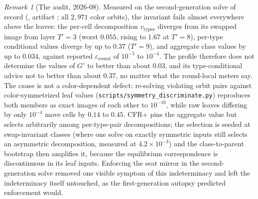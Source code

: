 \documentclass[11pt]{article}
\theoremstyle{plain}
\theoremstyle{definition}
\theoremstyle{remark}
\newtheorem{remark}[theorem]{Remark}
\newcommand{\gp}{\ensuremath{G'}}
\begin{document}
\begin{remark}[The audit, 2026-08]
Measured on the second-generation solve of record
(, artifact
; all $2{,}971$ color orbits), the
invariant fails almost everywhere above the leaves: the per-cell
decomposition $v_{\text{types}}$ diverges from its swapped image from
layer $T'{=}3$ (worst $0.055$, rising to $1.67$ at $T'{=}8$), per-type
conditional values diverge by up to $0.37$ ($T'{=}9$), and aggregate
class values by up to $0.034$, against reported
$\varepsilon_{\text{round}}$ of $10^{-5}$ to $10^{-4}$. The profile
therefore does not determine the values of $\gp$ to better than about
$0.03$, and its type-conditional advice not to better than about
$0.37$, no matter what the round-local meters say. The cause is not a
color-dependent defect: re-solving violating orbit pairs against
color-symmetrized leaf values
(\texttt{scripts/symmetry\_discriminate.py}) reproduces both members
as exact images of each other to $10^{-16}$, while raw leaves
differing by only $10^{-4}$ move cells by $0.14$ to $0.45$. CFR+ pins
the aggregate value but selects arbitrarily among per-type-pair
decompositions; the selection is seeded at swap-invariant classes
(where one solve on exactly symmetric inputs still selects an
asymmetric decomposition, measured at $4.2\times10^{-3}$) and the
class-to-parent bootstrap then amplifies it, because the equilibrium
correspondence is discontinuous in its leaf inputs. Enforcing the seat
mirror in the second-generation solve removed one visible symptom of
this indeterminacy and left the indeterminacy itself untouched, as the
first-generation autopsy predicted enforcement would.
\end{remark}
\end{document}
